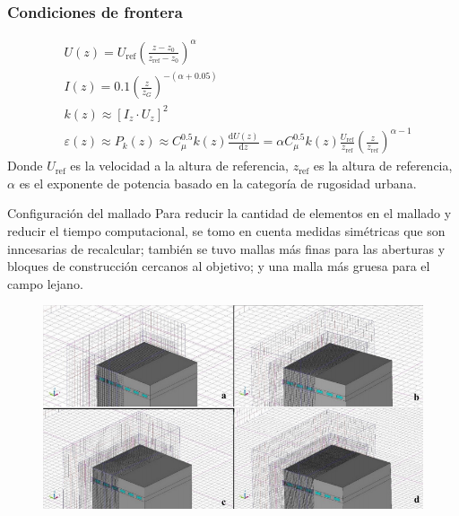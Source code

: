\documentclass[10pt]{beamer}
\begin{document}
\begin{frame}
\frametitle{Condiciones de frontera}
\begin{eqnarray}
&U(z) =  U_{\mathrm{ref}}\left( \frac{z-z_{0}}{z_{\mathrm{ref}}-z_{0}} \right)^{\alpha} \\[4pt]
&I(z) =  0.1\left( \frac{z}{z_{G}}\right)^{-(\alpha + 0.05)} \\[4pt]
&k(z) \approx  \left[ I_{z}\cdot U_{z} \right]^{2} \\[4pt]
&\varepsilon(z) \approx  P_{k}(z) \approx C_{\mu}^{0.5}k(z) \frac{\mathrm{d}U(z)}{\mathrm{d}z} = \alpha C_{\mu}^{0.5}k(z) \frac{U_{\mathrm{ref}}}{z_{\mathrm{ref}}}\left( \frac{z}{z_{\mathrm{ref}}}\right)^{\alpha - 1}
\end{eqnarray}
Donde $U_{\mathrm{ref}}$ es la velocidad a la altura de referencia, $z_{\mathrm{ref}}$ es la altura de referencia, $\alpha$ es el exponente de potencia basado en la categoría de rugosidad urbana.
\end{frame}
\begin{frame}{Configuración del mallado}
Para reducir la cantidad de elementos en el mallado y reducir el tiempo computacional, se tomo en cuenta medidas simétricas que son inncesarias de recalcular; también se tuvo mallas más finas para las aberturas y bloques de construcción cercanos al objetivo; y una malla más gruesa para el campo lejano.
\begin{figure}
\includegraphics[scale=0.35]{mallado.png}
\end{figure}
\end{frame}
\end{document}
